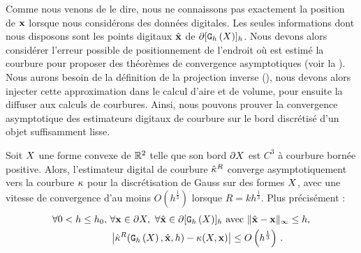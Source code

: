 Comme nous venons de le dire, nous ne connaissons pas exactement la position de
$\mathbf{x}$ lorsque nous considérons des données digitales. Les seules informations
dont nous disposons sont les points digitaux $\hat{\mathbf{x}}$ de $\partial \lbrack \mathtt{G}_{h}\left(X\right) \rbrack_{h}$.
Nous devons alors considérer l'erreur possible de positionnement de l'endroit où
est estimé la courbure pour proposer des théorèmes de convergence
asymptotiques (voir la ).
%
Nous aurons besoin de la définition de la projection inverse
(), nous devons alors injecter cette approximation
dans le calcul d'aire et de volume, pour ensuite la diffuser aux calculs de
courbures. Ainsi, nous pouvons prouver la convergence asymptotique des
estimateurs digitaux de courbure sur le bord discrétisé d'un objet suffisamment
lisse.
%
\begin{theorem}{} \label{thm:multigrid-convergence-curv}
%
Soit $X$ une forme convexe de $\mathbb{R}^2$ telle que son bord $\partial X$ est $C^3$ à
courbure bornée positive. Alors, l'estimateur digital de courbure $\hat{\kappa}^{R}$ converge
asymptotiquement vers la courbure $\kappa$ pour la discrétisation de Gauss sur
des formes $X$, avec une vitesse de convergence d'au moins
$O(h^\frac{1}{3})$ lorsque $R = kh^\frac{1}{3}$. Plus précisément :
%
\begin{align}
  \forall 0 < h \le h_0,\,\, & \forall \mathbf{x} \in \partial X,\,\,
  \forall \hat{\mathbf{x}} \in \partial \lbrack \mathtt{G}_{h}\left(X\right) \rbrack_{h} \text{~avec~} \| \hat{\mathbf{x}} -\mathbf{x}\|_\infty \le h, \nonumber \\
  & \left| \hat{\kappa}^{R}(\mathtt{G}_{h}\left(X\right), \hat{\mathbf{x}}, h) - \kappa(X, \mathbf{x}) \right| \le O\left(h^{\frac{1}{3}}\right)\,.
\end{align}
%
\end{theorem}
%
